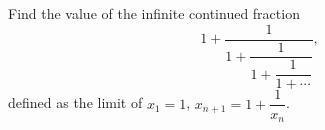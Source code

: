 Find the value of the infinite continued fraction
\[1+\dfrac{1}{1+\dfrac{1}{1+\dfrac{1}{1+\cdots}}},\]
defined as the limit of $x_1=1$, $x_{n+1}=1+\dfrac{1}{x_n}$.
